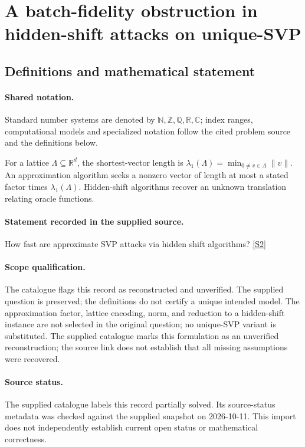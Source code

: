 \documentclass[11pt]{article}
\newcommand{\sref}[2]{\hyperlink{source:#1:#2}{[S#2]}}
\begin{document}
\section{A batch-fidelity obstruction in hidden-shift attacks on unique-SVP}\label{statement}

\subsection{Definitions and mathematical statement}

\paragraph{Shared notation.}Standard number systems are denoted by $\mathbb N,\mathbb Z,\mathbb Q,\mathbb R,\mathbb C$; index ranges, computational models and specialized notation follow the cited problem source and the definitions below.


For a lattice $\Lambda\subseteq\mathbb R^d$, the shortest-vector length is $\lambda_1(\Lambda)=\min_{0\ne v\in\Lambda}\|v\|$. An approximation algorithm seeks a nonzero vector of length at most a stated factor times $\lambda_1(\Lambda)$. Hidden-shift algorithms recover an unknown translation relating oracle functions.
\paragraph{Statement recorded in the supplied source.}
How fast are approximate SVP attacks via hidden shift algorithms? \sref{statement}{2}
\paragraph{Scope qualification.}
The catalogue flags this record as reconstructed and unverified. The supplied question is preserved; the definitions do not certify a unique intended model. The approximation factor, lattice encoding, norm, and reduction to a hidden-shift instance are not selected in the original question; no unique-SVP variant is substituted.
The supplied catalogue marks this formulation as an unverified reconstruction; the source link does not establish that all missing assumptions were recovered.
\paragraph{Source status.}
The supplied catalogue labels this record partially solved. Its source-status metadata was checked against the supplied snapshot on 2026-10-11. This import does not independently establish current open status or mathematical correctness.
\end{document}
